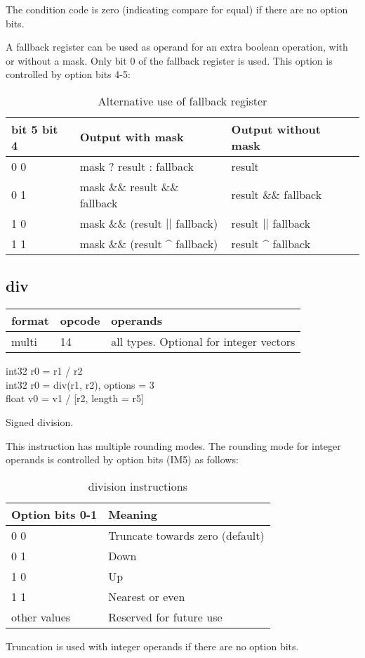 \documentclass[forwardcom.tex]{subfiles}
\begin{document}
The condition code is zero (indicating compare for equal) if there are no option bits. 
\vv
 
A fallback register can be used as operand for an extra boolean operation, with or without a mask. Only bit 0 of the fallback register is used. 
This option is controlled by option bits 4-5:

\begin{longtable} {|p{25mm}|p{50mm}|p{50mm}|}
\caption{Alternative use of fallback register} 
\label{table:AlternativeFallbackForCompare} \\
\endfirsthead
\endhead
\hline
\bfseries bit 5 bit 4 & \bfseries Output with mask & \bfseries Output without mask \\
\hline
\hspace{5mm} 0 0 & mask ? result : fallback  & result \\
\hline
\hspace{5mm} 0 1 & mask \&\& result \&\& fallback & result \&\& fallback \\
\hline
\hspace{5mm} 1 0 & mask \&\& (result $||$ fallback) & result $||$ fallback \\
\hline
\hspace{5mm} 1 1 & mask \&\& (result \^{} fallback) & result \^{} fallback \\
\hline
\end{longtable}
\vv

\subsection{div}
\label{table:divInstruction}
\begin{tabular}{|p{12mm}|p{15mm}|p{100mm}|}
\hline
\bfseries format & \bfseries opcode & \bfseries operands \\ \hline
multi & 14 & all types. Optional for integer vectors \\ \hline
\end{tabular}
\vv

int32 r0 = r1 / r2 \\
int32 r0 = div(r1, r2), options = 3\\
float v0 = v1 / [r2, length = r5]
\vv

Signed division.

\vv
This instruction has multiple rounding modes. The rounding mode for integer operands is controlled by option bits (IM5) as follows:

\begin{longtable} {|p{25mm}|p{80mm}|}
\caption{division instructions} 
\label{table:DivInstructions} \\
\endfirsthead
\endhead
\hline
\bfseries Option bits 0-1 & \bfseries Meaning   \\
\hline
 0 0 & Truncate towards zero (default) \\
 0 1 & Down \\
 1 0 & Up \\
 1 1 & Nearest or even \\
\hline
other values & Reserved for future use \\ 
\hline
\end{longtable}
Truncation is used with integer operands if there are no option bits.
\end{document}
